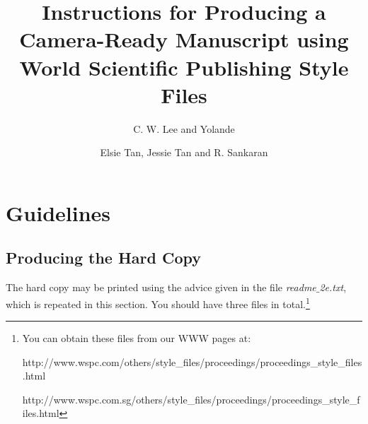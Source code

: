 \documentclass{ws-p8-50x6-00}
\begin{document}
\title{Instructions for Producing a Camera-Ready Manuscript
using  World Scientific Publishing Style Files}

\author{C. W. Lee and  Yolande}

\address{World Scientific Publishing Co., Inc, 1060 Main Street,  
River Edge NJ 07661, USA\\ 
E-mail: wspc@wspc.com}

\author{Elsie Tan, Jessie Tan and R. Sankaran}

\address{World Scientific Publishing Co Ltd, 
57 Shelton Street, Covent Garden, London WC2H 9HE, England\\
E-mail: wspc@wspc.ox.uk}  


\maketitle


\section{Guidelines}
\subsection{Producing the Hard Copy}\label{subsec:prod}
The hard copy may be printed using the advice given in the file
{\em readme$\_$2e.txt}, which is repeated in this section. You should
have three files in total.\footnote{You can obtain these files
from our WWW pages at:

\noindent
{\sf http://www.wspc.com/others/style\_files/proceedings/proceedings\_style\_files.html}

\noindent
{\sf http://www.wspc.com.sg/others/style\_files/proceedings/proceedings\_style\_files.html} }
\end{document}

